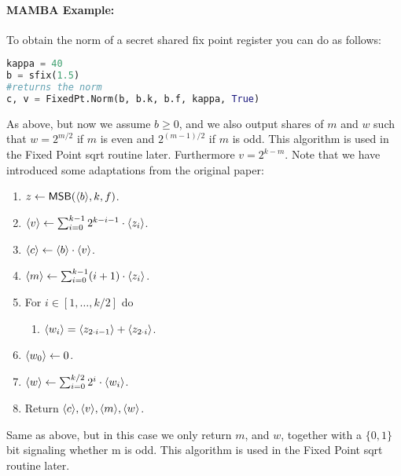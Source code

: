   \paragraph{MAMBA Example:} To obtain the norm of a secret shared fix point register you can do as follows:
  \begin{lstlisting}[language={python}]
kappa = 40
b = sfix(1.5)
#returns the norm
c, v = FixedPt.Norm(b, b.k, b.f, kappa, True)
\end{lstlisting}

  As above, but now we assume $b \ge 0$, and we also
  output shares of $m$ and $w$ such that $w=2^{m/2}$
  if $m$ is even and $2^{(m-1)/2}$ if $m$ is odd.
  This algorithm is used in the Fixed Point sqrt routine later.
  Furthermore $v = 2^{k-m}$. Note that we have introduced some adaptations from the original paper:
  \begin{enumerate}
    \item $z \leftarrow \mathsf{MSB}(\langle b \rangle,k,f)$.
    \item $\langle v \rangle \leftarrow \sum_{i=0}^{k-1} 2^{k-i-1} \cdot \langle z_i \rangle$.
    \item $\langle c \rangle \leftarrow \langle b \rangle \cdot \langle v \rangle$.
    \item $\langle m \rangle \leftarrow \sum_{i=0}^{k-1} (i+1) \cdot \langle z_i \rangle$.
    \item For $i \in [1,\ldots,k/2]$ do
          \begin{enumerate}
            \item $\langle w_i \rangle=\langle z_{2\cdot i-1} \rangle+\langle z_{2\cdot i} \rangle$.
          \end{enumerate}
    \item $\langle w_0 \rangle \leftarrow 0$.
    \item $\langle w \rangle \leftarrow \sum_{i=0}^{k/2} 2^i \cdot \langle w_i \rangle$.
    \item Return $\langle c \rangle, \langle v \rangle, \langle m \rangle, \langle w \rangle$.
  \end{enumerate}

  Same as above, but in this case we only return $m$, and $w$, together with a $\{0,1\}$ bit signaling whether m is odd.
  This algorithm is used in the Fixed Point sqrt routine later.

